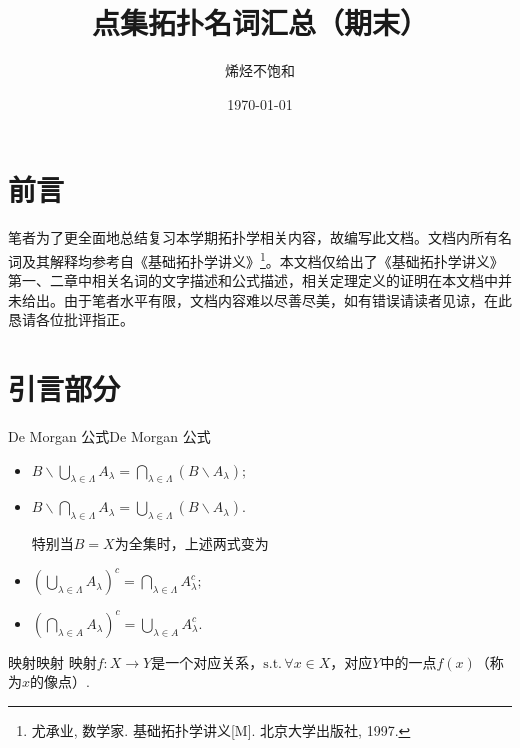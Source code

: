 \documentclass{ctexart}
\title{点集拓扑名词汇总（期末）}
\author{烯烃不饱和}
\date{\today}
\begin{document}
	
	\maketitle
\newpage
	\tableofcontents
\newpage
\section{前言}
	笔者为了更全面地总结复习本学期拓扑学相关内容，故编写此文档。文档内所有名词及其解释均参考自《基础拓扑学讲义》\footnote{尤承业, 数学家. 基础拓扑学讲义[M]. 北京大学出版社, 1997.}。本文档仅给出了《基础拓扑学讲义》第一、二章中相关名词的文字描述和公式描述，相关定理定义的证明在本文档中并未给出。由于笔者水平有限，文档内容难以尽善尽美，如有错误请读者见谅，在此恳请各位批评指正。
	
\section{引言部分}
	\begin{定理}{De Morgan 公式}{De Morgan 公式}{
		\begin{itemize}
			\item $B\backslash\bigcup_{\lambda\in\Lambda}A_\lambda=\bigcap_{\lambda\in\Lambda}\left(B\backslash A_\lambda\right);$
			\item $B\backslash\bigcap_{\lambda\in\Lambda}A_\lambda=\bigcup_{\lambda\in\Lambda}\left(B\backslash A_\lambda\right).$	\vspace{10pt}
				
			特别当$B=X$为全集时，上述两式变为
			\item $(\bigcup_{\lambda\in\Lambda}A_\lambda)^c=\bigcap_{\lambda\in\Lambda}A_\lambda^c;$
			\item $(\bigcap_{\lambda\in A}A_\lambda)^c=\bigcup_{\lambda\in A}A_\lambda^c.$
		\end{itemize}}
	\end{定理}
	\begin{定义}{映射}{映射}
		映射$f:X \rightarrow Y$是一个对应关系，$\text{s.t.}\,  \forall x \in X$，对应$Y$中的一点$f(x)$（称为$x$的像点）.
	\end{定义}
\end{document}
